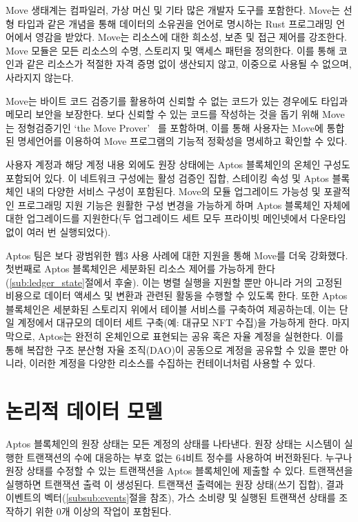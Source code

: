 \documentclass{article}
\begin{document}
Move 생태계는 컴파일러, 가상 머신 및 기타 많은 개발자 도구를 포함한다. Move는 선형 타입과 같은 개념을 통해 데이터의 소유권을 언어로 명시하는 Rust 프로그래밍 언어에서 영감을 받았다. Move는 리소스에 대한 희소성, 보존 및 접근 제어를 강조한다. Move 모듈은 모든 리소스의 수명, 스토리지 및 액세스 패턴을 정의한다. 이를 통해 코인과 같은 리소스가 적절한 자격 증명 없이 생산되지 않고, 이중으로 사용될 수 없으며, 사라지지 않는다.

Move는 바이트 코드 검증기를 활용하여 신뢰할 수 없는 코드가 있는 경우에도 타입과 메모리 보안을 보장한다. 보다 신뢰할 수 있는 코드를 작성하는 것을 돕기 위해 Move는 정형검증기인 `the Move Prover'~\cite{move_prover} 를 포함하며, 이를 통해 사용자는 Move에 통합된 명세언어를 이용하여 Move 프로그램의 기능적 정확성을 명세하고 확인할 수 있다.

사용자 계정과 해당 계정 내용 외에도 원장 상태에는 Aptos 블록체인의 온체인 구성도 포함되어 있다. 이 네트워크 구성에는 활성 검증인 집합, 스테이킹 속성 및 Aptos 블록체인 내의 다양한 서비스 구성이 포함된다. Move의 모듈 업그레이드 가능성 및 포괄적인 프로그래밍 지원 기능은 원활한 구성 변경을 가능하게 하며 Aptos 블록체인 자체에 대한 업그레이드를 지원한다(두 업그레이드 세트 모두 프라이빗 메인넷에서 다운타임 없이 여러 번 실행되었다).

Aptos 팀은 보다 광범위한 웹3 사용 사례에 대한 지원을 통해 Move를 더욱 강화했다. 첫번째로 Aptos 블록체인은 세분화된 리소스 제어를 가능하게 한다(\ref{sub:ledger_state}절에서 후술). 이는 병렬 실행을 지원할 뿐만 아니라 거의 고정된 비용으로 데이터 액세스 및 변환과 관련된 활동을 수행할 수 있도록 한다. 또한 Aptos 블록체인은 세분화된 스토리지 위에서 테이블 서비스를 구축하여 제공하는데, 이는 단일 계정에서 대규모의 데이터 세트 구축(예: 대규모 NFT 수집)을 가능하게 한다. 마지막으로, Aptos는 완전히 온체인으로 표현되는 공유 혹은 자율 계정을 실현한다. 이를 통해 복잡한 구조 분산형 자율 조직(DAO)이 공동으로 계정을 공유할 수 있을 뿐만 아니라, 이러한 계정을 다양한 리소스를 수집하는 컨테이너처럼 사용할 수 있다.

\section{논리적 데이터 모델}
\label{sec:logical}

Aptos 블록체인의 원장 상태는 모든 계정의 상태를 나타낸다. 원장 상태는 시스템이 실행한 트랜잭션의 수에 대응하는 부호 없는 64비트 정수를 사용하여 버전화된다. 누구나 원장 상태를 수정할 수 있는 트랜잭션을 Aptos 블록체인에 제출할 수 있다. 트랜잭션을 실행하면 트랜잭션 출력 이 생성된다. 트랜잭션 출력에는 원장 상태(쓰기 집합), 결과 이벤트의 벡터(\ref{subsub:events}절을 참조), 가스 소비량 및 실행된 트랜잭션 상태를 조작하기 위한 0개 이상의 작업이 포함된다.
\end{document}
